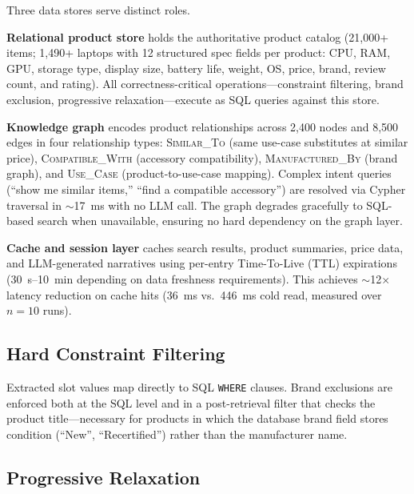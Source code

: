 \documentclass[sigconf,anonymous]{acmart}
\begin{document}
Three data stores serve distinct roles.

\textbf{Relational product store} holds the authoritative product catalog
(21,000+ items; 1,490+ laptops with 12 structured spec fields per product:
CPU, RAM, GPU, storage type, display size, battery life, weight, OS, price,
brand, review count, and rating).
All correctness-critical operations---constraint filtering, brand exclusion,
progressive relaxation---execute as SQL queries against this store.

\textbf{Knowledge graph} encodes product relationships across
2,400 nodes and 8,500 edges in four relationship types:
\textsc{Similar\_To} (same use-case substitutes at similar price),
\textsc{Compatible\_With} (accessory compatibility),
\textsc{Manufactured\_By} (brand graph), and
\textsc{Use\_Case} (product-to-use-case mapping).
Complex intent queries (``show me similar items,'' ``find a compatible
accessory'') are resolved via Cypher traversal in $\sim$17~ms with no LLM call.
The graph degrades gracefully to SQL-based search when unavailable,
ensuring no hard dependency on the graph layer.

\textbf{Cache and session layer} caches search results, product summaries,
price data, and LLM-generated narratives using per-entry Time-To-Live (TTL)
expirations (30~s--10~min depending on data freshness requirements).
This achieves $\sim$12$\times$ latency reduction on cache hits
(36~ms vs.\ 446~ms cold read, measured over $n = 10$ runs).


\subsection{Hard Constraint Filtering}

Extracted slot values map directly to SQL \texttt{WHERE} clauses.
Brand exclusions are enforced both at the SQL level and in a post-retrieval
filter that checks the product title---necessary for products in which the
database brand field stores condition (``New'', ``Recertified'') rather than
the manufacturer name.

\subsection{Progressive Relaxation}
\end{document}

